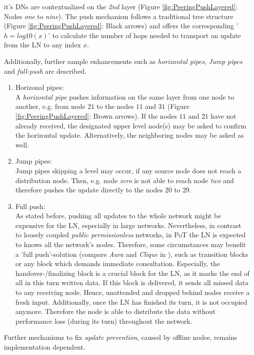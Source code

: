 it's \gls{DNs} are contextualized on the \textit{2nd} layer (Figure \ref{fig:PeeringPushLayered}: Nodes \textit{one} to \textit{nine}).
The push mechanism follows a traditional tree structure (Figure \ref{fig:PeeringPushLayered}: Black arrows) and offers the corresponding '$h = log10(x)$' to calculate the number of hops needed to transport an update from the \gls{LN} to any index $x$.
\begin{figure}
\end{figure}
Additionally, further sample enhancements such as \textit{horizontal pipes}, \textit{Jump pipes} and \textit{full-push} are described.
\begin{enumerate}
	\item Horizonal pipes: \\
	A \textit{horizontal pipe} pushes information on the same layer from one node to another, e.g. from node $21$ to the nodes $11$ and $31$ (Figure \ref{fig:PeeringPushLayered}: Brown arrows).
	If the nodes $11$ and $21$ have not already received,
	the designated upper level node(s) may be asked to confirm the horizontal update.
	Alternatively, the neighboring nodes may be asked as well.
	
	\item Jump pipes: \\
	Jump pipes skipping a level may occur, if any source node does not reach a distribution node.
	Then, e.g. node \textit{zero} is not able to reach node \textit{two} and therefore pushes the update directly to the nodes $20$ to $29$.
	
	\item Full push: \\
	As stated before, pushing all updates to the whole network might be expensive for the \gls{LN}, especially in large networks.
	Nevertheless, in contrast to loosely coupled \textit{public permissionless} networks,
	in \gls{PoT} the \gls{LN} is expected to knows all the network's nodes.
	Therefore, some circumstances may benefit a 'full push'-solution (compare \textit{Aura} and \textit{Clique} in \citet{Angelis.2018}), such as transition blocks or any block which demands immediate consultation.
	Especially, the handover-/finalizing block is a crucial block for the \gls{LN}, as it marks the end of all in this turn written data.
	If this block is delivered, it sends all missed data to any receiving node.
	Hence, unattended and dropped behind nodes receive a fresh input.
	Additionally, once the \gls{LN} has finished its turn, it is not occupied anymore.
	Therefore the node is able to distribute the data without performance loss (during its turn) throughout the network.
\end{enumerate}
Further mechanisms to fix \textit{update prevention}, caused by offline nodes, remains implementation dependent.

